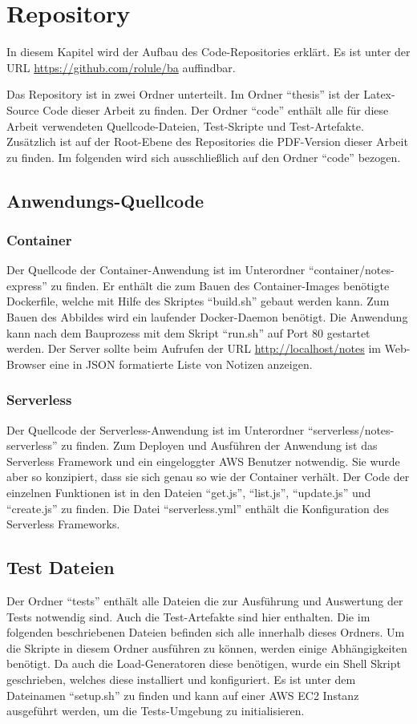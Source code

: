 \chapter{Repository}
\label{apx:repo}
In diesem Kapitel wird der Aufbau des Code-Repositories erklärt. Es ist unter der URL \url{https://github.com/rolule/ba} auffindbar.

Das Repository ist in zwei Ordner unterteilt. Im Ordner "`thesis"' ist der Latex-Source Code dieser Arbeit zu finden. Der Ordner "`code"' enthält alle für diese Arbeit verwendeten Quellcode-Dateien, Test-Skripte und Test-Artefakte. Zusätzlich ist auf der Root-Ebene des Repositories die PDF-Version dieser Arbeit zu finden. Im folgenden wird sich ausschließlich auf den Ordner "`code"' bezogen.

\section{Anwendungs-Quellcode}
\subsection{Container}
Der Quellcode der Container-Anwendung ist im Unterordner "`container/notes-express"' zu finden. Er enthält die zum Bauen des Container-Images benötigte Dockerfile, welche mit Hilfe des Skriptes "`build.sh"' gebaut werden kann. Zum Bauen des Abbildes wird ein laufender Docker-Daemon benötigt. Die Anwendung kann nach dem Bauprozess mit dem Skript "`run.sh"' auf Port 80 gestartet werden. Der Server sollte beim Aufrufen der URL \url{http://localhost/notes} im Web-Browser eine in JSON formatierte Liste von Notizen anzeigen. 

\subsection{Serverless}
Der Quellcode der Serverless-Anwendung ist im Unterordner "`serverless/notes-serverless"' zu finden. Zum Deployen und Ausführen der Anwendung ist das Serverless Framework und ein eingeloggter AWS Benutzer notwendig. Sie wurde aber so konzipiert, dass sie sich genau so wie der Container verhält. Der Code der einzelnen Funktionen ist in den Dateien "`get.js"', "`list.js"', "`update.js"' und "`create.js"' zu finden. Die Datei "`serverless.yml"' enthält die Konfiguration des Serverless Frameworks.

\section{Test Dateien}
Der Ordner "`tests"' enthält alle Dateien die zur Ausführung und Auswertung der Tests notwendig sind. Auch die Test-Artefakte sind hier enthalten. Die im folgenden beschriebenen Dateien befinden sich alle innerhalb dieses Ordners. Um die Skripte in diesem Ordner ausführen zu können, werden einige Abhängigkeiten benötigt. Da auch die Load-Generatoren diese benötigen, wurde ein Shell Skript geschrieben, welches diese installiert und konfiguriert. Es ist unter dem Dateinamen "`setup.sh"' zu finden und kann auf einer AWS EC2 Instanz ausgeführt werden, um die Tests-Umgebung zu initialisieren.

